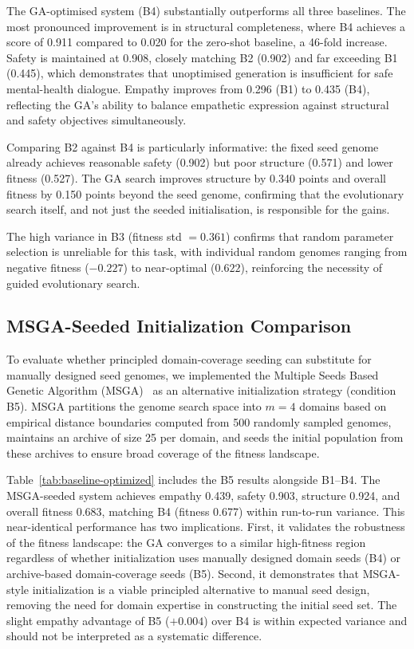 \documentclass[mathematics,article,xetex,moreauthors]{Definitions/mdpi}
\begin{document}
The GA-optimised system (B4) substantially outperforms all three baselines.
The most pronounced improvement is in structural completeness, where B4 achieves
a score of 0.911 compared to 0.020 for the zero-shot baseline, a 46-fold
increase. Safety is maintained at 0.908, closely matching B2 (0.902) and far
exceeding B1 (0.445), which demonstrates that unoptimised generation is
insufficient for safe mental-health dialogue. Empathy improves from 0.296
(B1) to 0.435 (B4), reflecting the GA's ability to balance empathetic
expression against structural and safety objectives simultaneously.

Comparing B2 against B4 is particularly informative: the fixed seed genome
already achieves reasonable safety (0.902) but poor structure (0.571) and
lower fitness (0.527). The GA search improves structure by 0.340 points and
overall fitness by 0.150 points beyond the seed genome, confirming that the
evolutionary search itself, and not just the seeded initialisation, is
responsible for the gains.

The high variance in B3 (fitness std $= 0.361$) confirms that random
parameter selection is unreliable for this task, with individual random genomes
ranging from negative fitness ($-0.227$) to near-optimal ($0.622$), reinforcing
the necessity of guided evolutionary search.


\subsection{MSGA-Seeded Initialization Comparison}
\label{sec:msga}

To evaluate whether principled domain-coverage seeding can substitute for
manually designed seed genomes, we implemented the Multiple Seeds Based
Genetic Algorithm (MSGA)~\cite{kabir2017msga} as an alternative initialization
strategy (condition B5). MSGA partitions the genome search space into $m = 4$
domains based on empirical distance boundaries computed from 500 randomly
sampled genomes, maintains an archive of size 25 per domain, and seeds the
initial population from these archives to ensure broad coverage of the fitness
landscape.

Table~\ref{tab:baseline-optimized} includes the B5 results alongside B1--B4.
The MSGA-seeded system achieves empathy 0.439, safety 0.903, structure 0.924,
and overall fitness 0.683, matching B4 (fitness 0.677) within run-to-run
variance. This near-identical performance has two implications. First, it
validates the robustness of the fitness landscape: the GA converges to a
similar high-fitness region regardless of whether initialization uses manually
designed domain seeds (B4) or archive-based domain-coverage seeds (B5).
Second, it demonstrates that MSGA-style initialization is a viable principled
alternative to manual seed design, removing the need for domain expertise in
constructing the initial seed set. The slight empathy advantage of B5
($+0.004$) over B4 is within expected variance and should not be interpreted
as a systematic difference.
\end{document}
